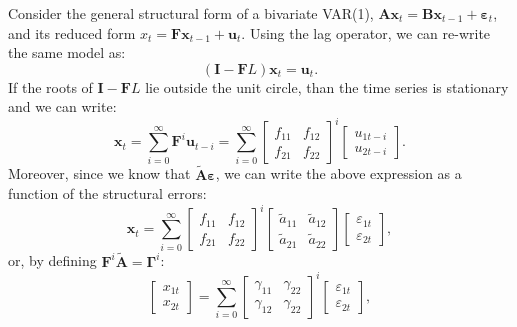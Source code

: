 \documentclass[11pt,a4paper]{report}
\numberwithin{equation}{chapter}
\numberwithin{section}{chapter}
\begin{document}
Consider the general structural form of a bivariate VAR(1), $\mathbf{Ax}_{t}=%
\mathbf{Bx}_{t-1}+\mathbf{\varepsilon }_{t}$, and its reduced form \textbf{$%
x $}$_{t}=\mathbf{Fx}_{t-1}+\mathbf{u}_{t}$. Using the lag operator, we can
re-write the same model as:%
\begin{equation*}
\left( \mathbf{I}-\mathbf{F}L\right) \mathbf{x}_{t}=\mathbf{u}_{t}.
\end{equation*}%
If the roots of $\mathbf{I}-\mathbf{F}L$ lie outside the unit circle, than
the time series is stationary and we can write:%
\begin{equation*}
\mathbf{x}_{t}=\sum_{i=0}^{\infty }\mathbf{F}^{i}\mathbf{u}%
_{t-i}=\sum_{i=0}^{\infty }\left[ 
\begin{array}{cc}
f_{11} & f_{12} \\ 
f_{21} & f_{22}%
\end{array}%
\right] ^{i}\left[ 
\begin{array}{c}
u_{1t-i} \\ 
u_{2t-i}%
\end{array}%
\right] .
\end{equation*}%
Moreover, since we know that $\mathbf{\tilde{A}\varepsilon }$, we can write
the above expression as a function of the structural errors:%
\begin{equation*}
\mathbf{x}_{t}=\sum_{i=0}^{\infty }\left[ 
\begin{array}{cc}
f_{11} & f_{12} \\ 
f_{21} & f_{22}%
\end{array}%
\right] ^{i}%
\begin{bmatrix}
\tilde{a}_{11} & \tilde{a}_{12} \\ 
\tilde{a}_{21} & \tilde{a}_{22}%
\end{bmatrix}%
\left[ 
\begin{array}{c}
\varepsilon _{1t} \\ 
\varepsilon _{2t}%
\end{array}%
\right] ,
\end{equation*}%
or, by defining $\mathbf{F}^{i}\mathbf{\tilde{A}}=\mathbf{\Gamma }^{i}$: 
\begin{equation*}
\begin{bmatrix}
x_{1t} \\ 
x_{2t}%
\end{bmatrix}%
=\sum_{i=0}^{\infty }%
\begin{bmatrix}
\gamma _{11} & \gamma _{22} \\ 
\gamma _{12} & \gamma _{22}%
\end{bmatrix}%
^{i}\left[ 
\begin{array}{c}
\varepsilon _{1t} \\ 
\varepsilon _{2t}%
\end{array}%
\right] ,
\end{equation*}%
\end{document}
